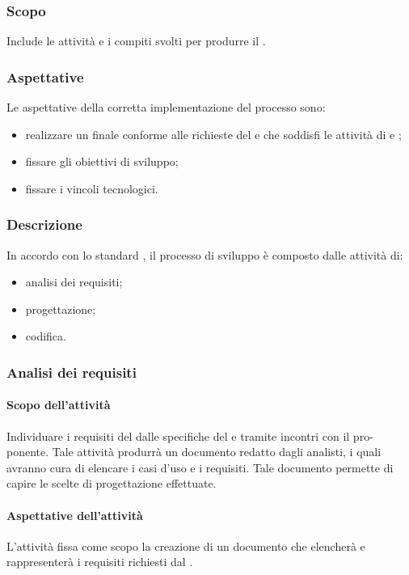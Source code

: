 \subsubsection{Scopo}
Include le attività e i compiti svolti per produrre il .
\subsubsection{Aspettative}
Le aspettative della corretta implementazione del processo sono:
\begin{itemize}
		\item realizzare un  finale conforme alle richieste del  e che soddisfi le attività di  e ;
		\item fissare gli obiettivi di sviluppo;
		\item fissare i vincoli tecnologici.
\end{itemize}

\subsubsection{Descrizione}
In accordo con lo standard , il processo di sviluppo è composto dalle attività di:
\begin{itemize}
		\item analisi dei requisiti;
		\item progettazione;
		\item codifica.
\end{itemize}

\subsubsection{Analisi dei requisiti}
 \paragraph{Scopo dell'attività}
  Individuare i requisiti del  dalle specifiche del  e tramite incontri con il pro-
  ponente. Tale attività produrrà un documento redatto dagli analisti, i quali avranno cura di elencare i casi d'uso e i requisiti. Tale documento permette di
 capire le scelte di progettazione effettuate.
 \paragraph{Aspettative dell'attività}
 L'attività fissa come scopo la creazione di un documento che elencherà e rappresenterà i requisiti richiesti dal .
